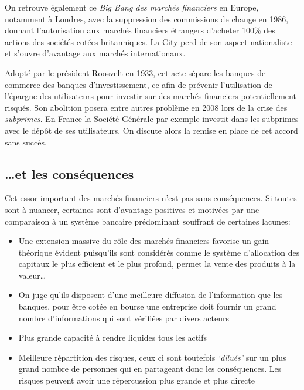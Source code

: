 \documentclass[main.tex]{subfiles}
\begin{document}
On retrouve également ce \emph{Big Bang des marchés financiers} en Europe, notamment à Londres, avec la suppression des commissions de change en 1986, donnant l'autorisation aux marchés financiers étrangers d'acheter 100\% des actions des sociétés cotées britanniques. La City perd de son aspect nationaliste et s'ouvre d'avantage aux marchés internationaux.

\begin{definition}
        Adopté par le président Roosvelt en 1933, cet acte sépare les banques de commerce des banques d'investissement, ce afin de prévenir l'utilisation de l'épargne des utilisateurs pour investir sur des marchés financiers potentiellement risqués. Son abolition posera entre autres problème en 2008 lors de la crise des \emph{subprimes}. En France la Société Générale par exemple investit dans les subprimes avec le dépôt de ses utilisateurs. On discute alors la remise en place de cet accord sans succès.
\end{definition}

\subsection{\ldots et les conséquences}

Cet essor important des marchés financiers n'est pas sans conséquences. Si toutes sont à nuancer, certaines sont d'avantage positives et motivées par une comparaison à un système bancaire prédominant souffrant de certaines lacunes:
\begin{itemize}
        \item Une extension massive du rôle des marchés financiers favorise un gain théorique évident puisqu'ils sont considérés comme le système d'allocation des capitaux le plus efficient et le plus profond, permet la vente des produits à la valeur\ldots
        \item On juge qu'ils disposent d'une meilleure diffusion de l'information que les banques, pour être cotée en bourse une entreprise doit fournir un grand nombre d'informations qui sont vérifiées par divers acteurs
        \item Plus grande capacité à rendre liquides tous les actifs
        \item Meilleure répartition des risques, ceux ci sont toutefois \textit{`dilués'} sur un plus grand nombre de personnes qui en partageant donc les conséquences. Les risques peuvent avoir une répercussion plus grande et plus directe
\end{itemize}
\end{document}
